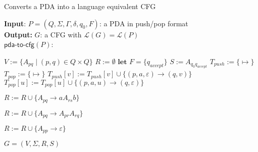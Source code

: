 \documentclass[11pt]{article}
\newcommand*{\Language}[1]{\ensuremath{\mathcal{L}(#1)}}
\newcommand{\emptymap}{\ensuremath{\{ \mapsto \}}}
\begin{document}
\begin{algorithm}
\small
\caption{Converts a PDA into a language equivalent CFG}
\vspace*{1ex}
{\textbf{Input}:} 
$P = (Q, \Sigma, \Gamma, \delta, q_0, F)$: a PDA in push/pop format \\
\textbf{Output:}
$G$: a CFG with $\Language{G} = \Language{P}$ \\

$\textsf{pda-to-cfg}(P)$:
\begin{algorithmic}[1]
\State $V := \{ A_{pq} \mid (p, q) \in Q \times Q \}$
\State $R := \emptyset$
\State $\textbf{let } F = \{ q_{accept} \}$
\State $S := A_{q_0q_{accept}}$
\State $T_{push} := \emptymap$ 
\State $T_{pop} := \emptymap$ 
      \State $T_{push}[v] := T_{push}[v] \cup \{ (p, a, \varepsilon) \rightarrow (q, v) \}$
      \State $T_{pop}[u] := T_{pop}[u] \cup \{ (p, a, u) \rightarrow (q, \varepsilon) \}$
    \EndIf
  \EndFor    
\EndFor

     \State $R := R \cup \{ A_{pq} \rightarrow aA_{rs}b \}$
  \EndFor
\EndFor

     \State $R := R \cup \{ A_{pq} \rightarrow A_{pr}A_{rq} \}$
\EndFor

     \State $R := R \cup \{ A_{pp} \rightarrow \varepsilon \}$
\EndFor

\State \Return $G = (V, \Sigma, R, S)$
\end{algorithmic}
\end{algorithm}
\end{document}
